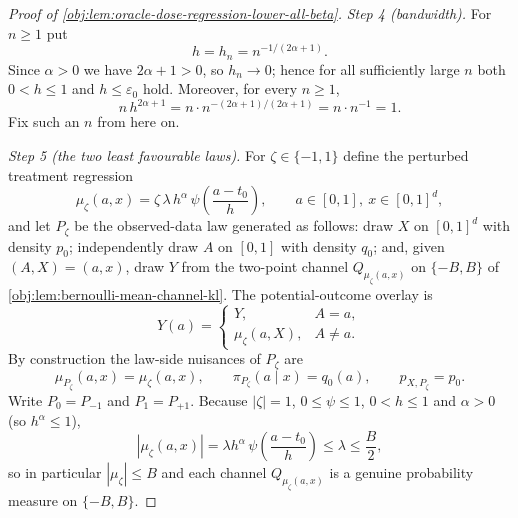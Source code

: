 \begin{proof}[Proof of \cref{obj:lem:oracle-dose-regression-lower-all-beta}]
\emph{Step 4 (bandwidth).} For \(n\ge1\) put
\[
h=h_n=n^{-1/(2\alpha+1)} .
\]
Since \(\alpha>0\) we have \(2\alpha+1>0\), so \(h_n\to 0\); hence for all sufficiently large \(n\)
both \(0<h\le 1\) and \(h\le\varepsilon_0\) hold. Moreover, for every \(n\ge1\),
\[
n\,h^{2\alpha+1}
=
n\cdot n^{-(2\alpha+1)/(2\alpha+1)}
=
n\cdot n^{-1}
=
1 .
\]
Fix such an \(n\) from here on. %

\emph{Step 5 (the two least favourable laws).} For \(\zeta\in\{-1,1\}\) define the perturbed
treatment regression
\[
\mu_\zeta(a,x)
=
\zeta\,\lambda\,h^{\alpha}\,\psi\!\left(\frac{a-t_0}{h}\right),
\qquad a\in[0,1],\ x\in[0,1]^d,
\]
and let \(P_\zeta\) be the observed-data law generated as follows: draw \(X\) on \([0,1]^d\) with
density \(p_0\); independently draw \(A\) on \([0,1]\) with density \(q_0\); and, given
\((A,X)=(a,x)\), draw \(Y\) from the two-point channel \(Q_{\mu_\zeta(a,x)}\) on \(\{-B,B\}\) of
\cref{obj:lem:bernoulli-mean-channel-kl}. The potential-outcome overlay is
\[
Y(a)=
\begin{cases}
Y, & A=a,\\
\mu_\zeta(a,X), & A\ne a .
\end{cases}
\]
By construction the law-side nuisances of \(P_\zeta\) are
\[
\mu_{P_\zeta}(a,x)=\mu_\zeta(a,x),
\qquad
\pi_{P_\zeta}(a\mid x)=q_0(a),
\qquad
p_{X,P_\zeta}=p_0 .
\]
Write \(P_0=P_{-1}\) and \(P_1=P_{+1}\). Because \(|\zeta|=1\), \(0\le\psi\le1\), \(0<h\le1\) and
\(\alpha>0\) (so \(h^\alpha\le 1\)),
\[
|\mu_\zeta(a,x)|
=
\lambda h^{\alpha}\,\psi\!\left(\frac{a-t_0}{h}\right)
\le
\lambda
\le
\frac B2 ,
\]
so in particular \(|\mu_\zeta|\le B\) and each channel \(Q_{\mu_\zeta(a,x)}\) is a genuine
probability measure on \(\{-B,B\}\).


\end{proof}
